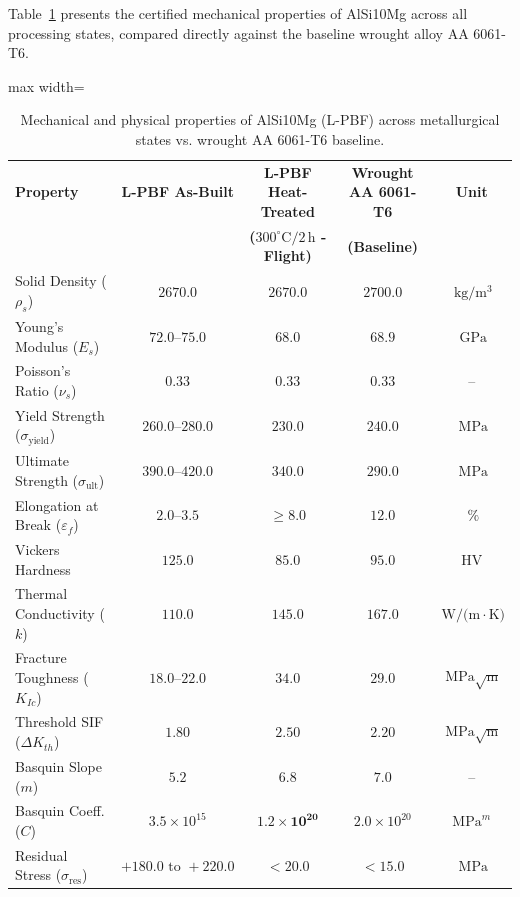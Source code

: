Table~\ref{tab:material_properties_comparison} presents the certified mechanical properties of AlSi10Mg across all processing states, compared directly against the baseline wrought alloy AA 6061-T6.

\begin{table}[htbp]
\centering
\caption{Mechanical and physical properties of AlSi10Mg (L-PBF) across metallurgical states vs. wrought AA 6061-T6 baseline.}
\label{tab:material_properties_comparison}
\begin{adjustbox}{max width=\textwidth}
\begin{tabular}{lcccc}
\toprule
\textbf{Property} & \textbf{L-PBF As-Built} & \textbf{L-PBF Heat-Treated} & \textbf{Wrought AA 6061-T6} & \textbf{Unit} \\
 & & \textbf{($300^\circ\text{C} / 2\,\text{h}$ - Flight)} & \textbf{(Baseline)} & \\
\midrule
Solid Density ($\rho_s$) & $2670.0$ & $2670.0$ & $2700.0$ & $\SI{}{\kilo\gram/\meter^3}$ \\
Young's Modulus ($E_s$) & $72.0\text{--}75.0$ & $\mathbf{68.0}$ & $68.9$ & $\SI{}{\giga\pascal}$ \\
Poisson's Ratio ($\nu_s$) & $0.33$ & $\mathbf{0.33}$ & $0.33$ & -- \\
Yield Strength ($\sigma_{\text{yield}}$) & $260.0\text{--}280.0$ & $\mathbf{230.0}$ & $240.0$ & $\SI{}{\mega\pascal}$ \\
Ultimate Strength ($\sigma_{\text{ult}}$) & $390.0\text{--}420.0$ & $\mathbf{340.0}$ & $290.0$ & $\SI{}{\mega\pascal}$ \\
Elongation at Break ($\varepsilon_f$) & $2.0\text{--}3.5$ & $\mathbf{\ge 8.0}$ & $12.0$ & $\SI{}{\percent}$ \\
Vickers Hardness & $125.0$ & $85.0$ & $95.0$ & $\text{HV}$ \\
Thermal Conductivity ($k$) & $110.0$ & $145.0$ & $167.0$ & $\SI{}{\watt/(\meter\cdot\kelvin)}$ \\
Fracture Toughness ($K_{Ic}$) & $18.0\text{--}22.0$ & $\mathbf{34.0}$ & $29.0$ & $\SI{}{\mega\pascal}\sqrt{\text{m}}$ \\
Threshold SIF ($\Delta K_{th}$) & $1.80$ & $\mathbf{2.50}$ & $2.20$ & $\SI{}{\mega\pascal}\sqrt{\text{m}}$ \\
Basquin Slope ($m$) & $5.2$ & $\mathbf{6.8}$ & $7.0$ & -- \\
Basquin Coeff. ($C$) & $3.5 \times 10^{15}$ & $\mathbf{1.2 \times 10^{20}}$ & $2.0 \times 10^{20}$ & $\text{MPa}^m$ \\
Residual Stress ($\sigma_{\text{res}}$) & $+180.0\text{ to }+220.0$ & $\mathbf{< 20.0}$ & $< 15.0$ & $\SI{}{\mega\pascal}$ \\
\bottomrule
\end{tabular}
\end{adjustbox}
\end{table}

